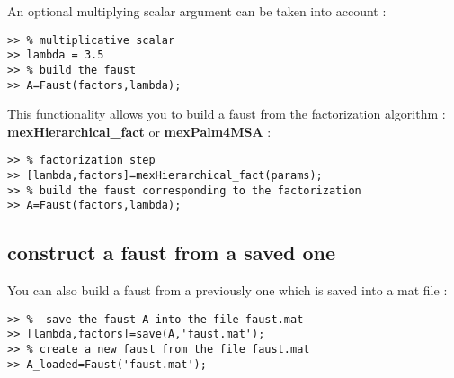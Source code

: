 An optional multiplying scalar argument can be taken into account  :
\begin{lstlisting}
>> % multiplicative scalar
>> lambda = 3.5 
>> % build the faust
>> A=Faust(factors,lambda);
\end{lstlisting}

This functionality allows you to build a faust from the factorization algorithm :
\textbf{mexHierarchical{\_}fact} or \textbf{mexPalm4MSA} :
\begin{lstlisting}
>> % factorization step
>> [lambda,factors]=mexHierarchical_fact(params);
>> % build the faust corresponding to the factorization
>> A=Faust(factors,lambda);
\end{lstlisting}

\subsection{construct a faust from a saved one}\label{sec:firstUseBuildFromSave}

You can also build a faust from a previously one which is saved into a mat file :
\begin{lstlisting}
>> %  save the faust A into the file faust.mat
>> [lambda,factors]=save(A,'faust.mat');
>> % create a new faust from the file faust.mat
>> A_loaded=Faust('faust.mat');
\end{lstlisting}
 
